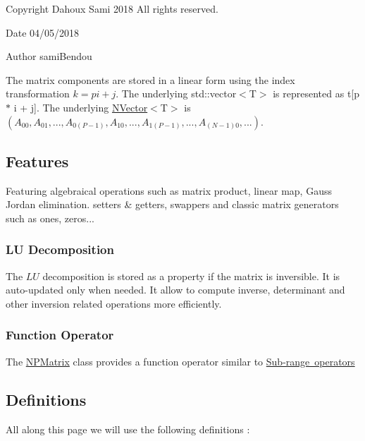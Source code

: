 \begin{DoxyCopyright}{Copyright}
Dahoux Sami 2018 All rights reserved. 
\end{DoxyCopyright}
\begin{DoxyDate}{Date}
04/05/2018 
\end{DoxyDate}
\begin{DoxyAuthor}{Author}
sami\+Bendou
\end{DoxyAuthor}
The matrix components are stored in a linear form using the index transformation $ k = p i + j $. The underlying {\ttfamily std\+::vector$<$T$>$} is represented as {\ttfamily t\mbox{[}p $\ast$ i + j\mbox{]}}. The underlying {\ttfamily \mbox{\hyperlink{class_n_vector}{N\+Vector}}$<$T$>$} is $ (A_{00}, A_{01}, ..., A_{0(P - 1)}, A_{10}, ..., A_{1(P - 1)}, ..., A_{(N-1)0}, ...) $.\hypertarget{class_n_vector_Features}{}\subsection{Features}\label{class_n_vector_Features}
Featuring algebraical operations such as matrix product, linear map, Gauss Jordan elimination. setters \& getters, swappers and classic matrix generators such as ones, zeros...\hypertarget{class_n_p_matrix_LUDecomp}{}\subsubsection{L\+U Decomposition}\label{class_n_p_matrix_LUDecomp}
The $ LU $ decomposition is stored as a property if the matrix is inversible. It is auto-\/updated only when needed. It allow to compute inverse, determinant and other inversion related operations more efficiently.\hypertarget{group___n_algebra_FuncOp}{}\subsubsection{Function Operator}\label{group___n_algebra_FuncOp}
The {\ttfamily \mbox{\hyperlink{class_n_p_matrix}{N\+P\+Matrix}}} class provides a function operator similar to \mbox{\hyperlink{class_n_vector_FuncOpVec}{Sub-\/range operators}}\hypertarget{class_n_vector_Definitions}{}\subsection{Definitions}\label{class_n_vector_Definitions}
All along this page we will use the following definitions \+:
